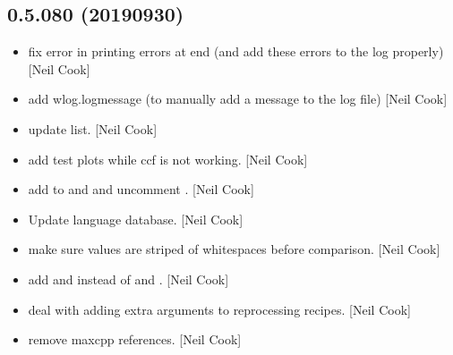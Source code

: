 \documentclass[a4paper,10pt,english]{report}
\begin{document}
\subsection{0.5.080 (2019\sphinxhyphen{}09\sphinxhyphen{}30)}
\label{\detokenize{misc/changelog:id82}}\begin{itemize}
\item {} 
 \sphinxhyphen{} fix error in printing errors at
end (and add these errors to the log properly) {[}Neil Cook{]}

\item {} 
 \sphinxhyphen{} add wlog.logmessage (to manually add a message
to the log file) {[}Neil Cook{]}

\item {} 
 \sphinxhyphen{} update list. {[}Neil Cook{]}

\item {} 
 \sphinxhyphen{} add test plots while ccf is
not working. {[}Neil Cook{]}

\item {} 
 \sphinxhyphen{} add  to 
and  and uncomment . {[}Neil Cook{]}

\item {} 
Update language database. {[}Neil Cook{]}

\item {} 
 \sphinxhyphen{} make sure values are striped of whitespaces
before comparison. {[}Neil Cook{]}

\item {} 
 \sphinxhyphen{} add  and
 instead of  and
. {[}Neil Cook{]}

\item {} 
 \sphinxhyphen{} deal with adding extra arguments
to reprocessing recipes. {[}Neil Cook{]}

\item {} 
 \sphinxhyphen{} remove maxcpp references. {[}Neil Cook{]}


\end{itemize}
\end{document}
